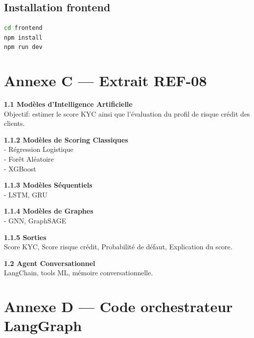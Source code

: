 \section{Installation frontend}

\begin{lstlisting}[language=bash,caption={Setup React}]
cd frontend
npm install
npm run dev
\end{lstlisting}

\chapter{Annexe C — Extrait REF-08}
\label{ann:ref08}

\begin{tcolorbox}[colback=codebg,colframe=codeframe,title=REF-08 — Extrait]
\textbf{1.1 Modèles d'Intelligence Artificielle}\\
Objectif: estimer le score KYC ainsi que l'évaluation du profil de risque crédit des clients.

\textbf{1.1.2 Modèles de Scoring Classiques}\\
- Régression Logistique\\
- Forêt Aléatoire\\
- XGBoost

\textbf{1.1.3 Modèles Séquentiels}\\
- LSTM, GRU

\textbf{1.1.4 Modèles de Graphes}\\
- GNN, GraphSAGE

\textbf{1.1.5 Sorties}\\
Score KYC, Score risque crédit, Probabilité de défaut, Explication du score.

\textbf{1.2 Agent Conversationnel}\\
LangChain, tools ML, mémoire conversationnelle.
\end{tcolorbox}

\chapter{Annexe D — Code orchestrateur LangGraph}
\label{ann:langgraph}

